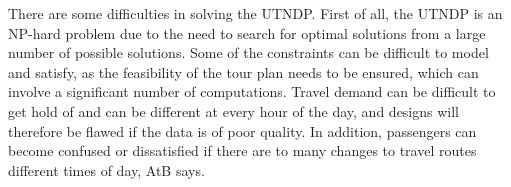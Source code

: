 There are some difficulties in solving the UTNDP. First of all, the UTNDP is an NP-hard problem due to the need to search for optimal solutions from a large number of possible solutions. Some of the constraints can be difficult to model and satisfy, as the feasibility of the tour plan needs to be ensured, which can involve a significant number of computations. Travel demand can be difficult to get hold of and can be different at every hour of the day, and designs will therefore be flawed if the data is of poor quality. In addition, passengers can become confused or dissatisfied if there are to many changes to travel routes different times of day, AtB says. 





